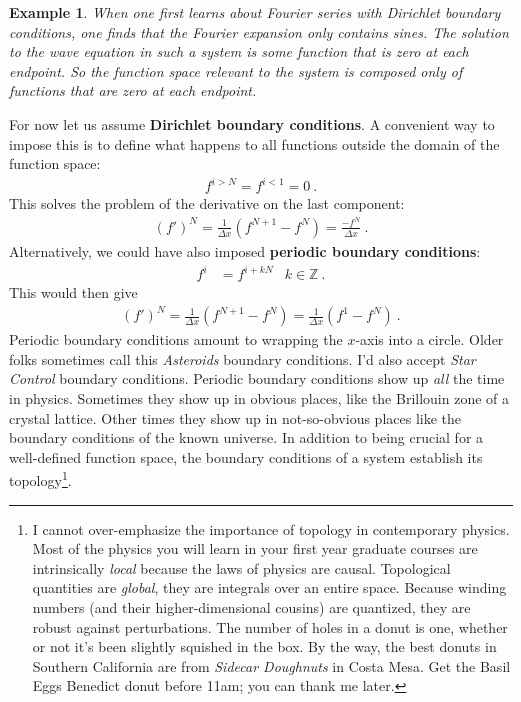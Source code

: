 \documentclass[
  11pt,
	colorful,
	raggedright,
]{tufte-style-thesis-flip}
\newtheorem{example}{Example}[section]
\begin{document}
%
\begin{example}
When one first learns about Fourier series with Dirichlet boundary conditions, one finds that the Fourier expansion \emph{only} contains sines. The solution to the wave equation in such a system is some function that is zero at each endpoint. So the function space relevant to the system is composed only of functions that are zero at each endpoint.
\end{example}
%
For now let us assume \textbf{Dirichlet boundary conditions}. A convenient way to impose this is to define what happens to all functions outside the domain of the function space:
\begin{align}
  f^{i > N} = f^{i < 1} = 0 \ .
\end{align}
This solves the problem of the derivative on the last component:
\begin{align}
  {(f')}^N = \frac{1}{\Delta x}(f^{N+1} - f^N) 
  = 
  \frac{- f^N}{\Delta x}  \ .
\end{align}
Alternatively, we could have also imposed \textbf{periodic boundary conditions}:
\begin{align}
  f^{i} &= f^{i+ kN}
  & k\in \mathbb{Z} \ .
\end{align}
This would then give
\begin{align}
  {(f')}^N = \frac{1}{\Delta x}(f^{N+1} - f^N) 
  = 
  \frac{1}{\Delta x}(f^{1} - f^N) 
  \ .
\end{align}
Periodic boundary conditions amount to wrapping the $x$-axis into a circle. Older folks sometimes call this \emph{Asteroids} boundary conditions. I'd also accept \emph{Star Control} boundary conditions. Periodic boundary conditions show up \emph{all} the time in physics. Sometimes they show up in obvious places, like the Brillouin zone of a crystal lattice. Other times they show up in not-so-obvious places like the boundary conditions of the known universe. In addition to being crucial for a well-defined function space, the boundary conditions of a system establish its topology\footnote{I cannot over-emphasize the importance of topology in contemporary physics. Most of the physics you will learn in your first year graduate courses are intrinsically \emph{local} because the laws of physics are causal. Topological quantities are \emph{global}, they are integrals over an entire space. Because winding numbers (and their higher-dimensional cousins) are quantized, they are robust against perturbations. The number of holes in a donut is one, whether or not it's been slightly squished in the box. By the way, the best donuts in Southern California are from \emph{Sidecar Doughnuts} in Costa Mesa. Get the Basil Eggs Benedict donut before 11am; you can thank me later.}.
\end{document}
